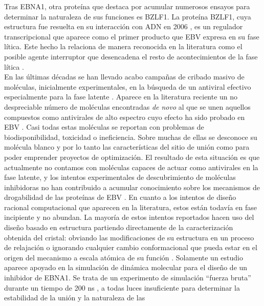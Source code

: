 \documentclass[12pt,letterpaper]{article} %
\begin{document}
Tras EBNA1, otra proteína que destaca por acumular numerosos ensayos para
determinar la naturaleza de sus funciones es BZLF1. La proteína BZLF1, cuya
estructura fue resuelta en su interacción con ADN en 2006 \cite{Petosa2006}, es
un regulador transcripcional que aparece como el primer producto que EBV expresa
en su fase lítica. Este hecho la relaciona de manera reconocida en la
literatura como el posible agente interruptor que
desencadena el resto de acontecimientos de la fase lítica
\cite{Petosa2006,Daskalogianni2015,Hartlage2015,Lima2013a}.
\\

En las últimas décadas se han llevado acabo campañas de cribado masivo de
moléculas, inicialmente experimentales, en la búsqueda de un antiviral efectivo
especialmente para la fase latente
\cite{Henderson1982,Orlowski1990,Li2010a,Li2010b,Lima2013a}. Aparece en la
literatura reciente un no despreciable número de moléculas encontradas \emph{de
  novo} al que se unen aquellos compuestos como antivirales de alto espectro
cuyo efecto ha sido probado en EBV
\cite{Gershburg2005,Li2010a,Clercq2002,Hornig2014}. Casi todas estas moléculas
se reportan con problemas de biodisponibilidad, toxicidad o ineficiencia. Sobre
muchas de ellas se desconoce su molécula blanco y por lo tanto las
características del sitio de unión como para poder emprender proyectos de
optimización. El resultado de esta situación es que actualmente no contamos con
moléculas capaces de actuar como antivirales en la fase latente, y los intentos
experimentales de descubrimiento de moléculas inhibidoras no han contribuido a
acumular conocimiento sobre los mecanismos de drogabilidad de las proteínas de
EBV \cite{Gianti2016}. En cuanto a los intentos de diseño racional computacional
que aparecen en la literatura, estos están todavía en fase incipiente y no
abundan. La mayoría de estos intentos reportados hacen uso del diseño basado en
estructura partiendo directamente de la caracterización obtenida del cristal:
obviando las modificaciones de su estructura en un proceso de relajación o
ignorando cualquier cambio conformacional que pueda estar en el origen del
mecanismo a escala atómica de su función
\cite{Li2010a,Li2010b,Hornig2014,Gianti2016,Young2016,Messick2017,Jiang2017}.
Solamente un estudio aparece apoyado en la simulación de dinámica molecular para
el diseño de un inhibidor de EBNA1. Se trata de un experimento de simulación
``fuerza bruta'' durante un tiempo de 200 ns \cite{Jiang2017}, a todas luces
insuficiente para determinar la estabilidad de la unión y la naturaleza de las
\end{document}
